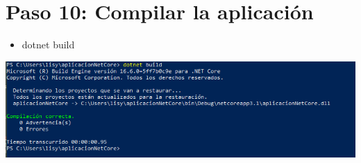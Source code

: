\section{Paso 10: Compilar la aplicación } 
\begin{itemize}
    \item dotnet build
\end{itemize}
\begin{center}
\includegraphics[width=\columnwidth]{images/14}\newline
\end{center}

